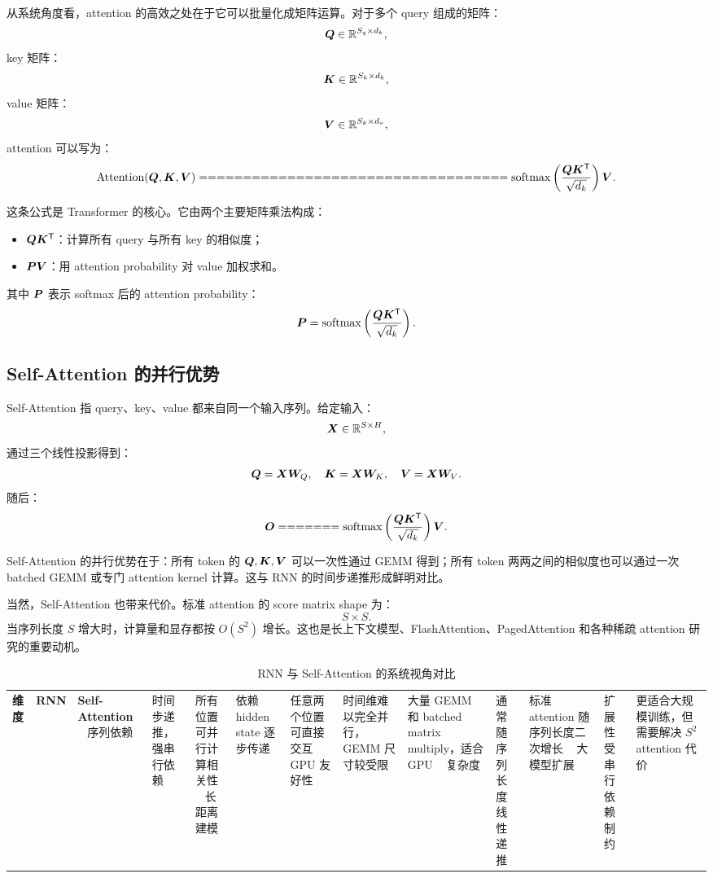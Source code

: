 从系统角度看，attention 的高效之处在于它可以批量化成矩阵运算。对于多个 query 组成的矩阵：
\[
\bm{Q}\in\mathbb{R}^{S_q\times d_k},
\]
key 矩阵：
\[
\bm{K}\in\mathbb{R}^{S_k\times d_k},
\]
value 矩阵：
\[
\bm{V}\in\mathbb{R}^{S_k\times d_v},
\]
attention 可以写为：
\[
\Attention(\mat{Q},\mat{K},\mat{V})
===================================

\softmax
\left(
\frac{\mat{Q}\mat{K}^{\mathsf{T}}}{\sqrt{d_k}}
\right)
\mat{V}.
\]

这条公式是 Transformer 的核心。它由两个主要矩阵乘法构成：

\begin{itemize}
\item $\bm{Q}\bm{K}^{\mathsf{T}}$：计算所有 query 与所有 key 的相似度；
\item $\bm{P}\bm{V}$：用 attention probability 对 value 加权求和。
\end{itemize}

其中 $\bm{P}$ 表示 softmax 后的 attention probability：
\[
\bm{P}=
\operatorname{softmax}
\left(
\frac{\bm{Q}\bm{K}^{\mathsf{T}}}{\sqrt{d_k}}
\right).
\]

\subsection{Self-Attention 的并行优势}
\label{subsec:self-attention-parallel-advantage}

Self-Attention 指 query、key、value 都来自同一个输入序列。给定输入：
\[
\bm{X}\in\mathbb{R}^{S\times H},
\]
通过三个线性投影得到：
\[
\bm{Q}=\bm{X}\bm{W}_Q,\quad
\bm{K}=\bm{X}\bm{W}_K,\quad
\bm{V}=\bm{X}\bm{W}_V.
\]
随后：
\[
\mat{O}
=======

\softmax
\left(
\frac{\mat{Q}\mat{K}^{\mathsf{T}}}{\sqrt{d_k}}
\right)\mat{V}.
\]

Self-Attention 的并行优势在于：所有 token 的 $\bm{Q},\bm{K},\bm{V}$ 可以一次性通过 GEMM 得到；所有 token 两两之间的相似度也可以通过一次 batched GEMM 或专门 attention kernel 计算。这与 RNN 的时间步递推形成鲜明对比。

当然，Self-Attention 也带来代价。标准 attention 的 score matrix shape 为：
\[
S\times S.
\]
当序列长度 $S$ 增大时，计算量和显存都按 $O(S^2)$ 增长。这也是长上下文模型、FlashAttention、PagedAttention 和各种稀疏 attention 研究的重要动机。

\begin{table}[H]
\centering
\small
\caption{RNN 与 Self-Attention 的系统视角对比}
\label{tab:rnn-self-attention-system-view}
\begin{tabular}{p{}p{}p{}}
\toprule
\textbf{维度} & \textbf{RNN} & \textbf{Self-Attention} \
\midrule
序列依赖
& 时间步递推，强串行依赖
& 所有位置可并行计算相关性 \
\midrule
长距离建模
& 依赖 hidden state 逐步传递
& 任意两个位置可直接交互 \
\midrule
GPU 友好性
& 时间维难以完全并行，GEMM 尺寸较受限
& 大量 GEMM 和 batched matrix multiply，适合 GPU \
\midrule
复杂度
& 通常随序列长度线性递推
& 标准 attention 随序列长度二次增长 \
\midrule
大模型扩展
& 扩展性受串行依赖制约
& 更适合大规模训练，但需要解决 $S^2$ attention 代价 \
\bottomrule
\end{tabular}
\end{table}

